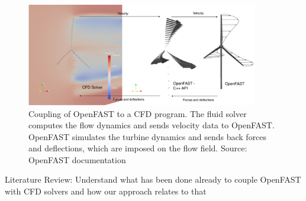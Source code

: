 \begin{figure}[h]
	\centering
	\includegraphics[width=0.9\textwidth]{images/openfast-coupling-scheme.png}
	\caption{Coupling of OpenFAST to a CFD program. The fluid solver computes the flow dynamics and sends velocity data to OpenFAST. OpenFAST simulates the turbine dynamics and sends back forces and deflections, which are imposed on the flow field. Source: OpenFAST documentation\protect\footnotemark}
	\label{fig:openfast:coupling}
\end{figure}


Literature Review: Understand what has been done already to couple OpenFAST with CFD solvers and how our approach relates to that
\\

